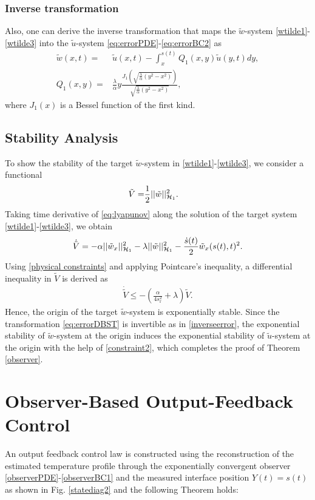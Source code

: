 \documentclass[journal]{IEEEtran}
\begin{document}
\subsubsection{Inverse transformation }
Also, one can derive the inverse transformation that maps the $\tilde{w}$-system  \eqref{wtilde1}-\eqref{wtilde3} into the $\tilde{u}$-system  \eqref{eq:errorPDE}-\eqref{eq:errorBC2} as
\begin{align}\label{inverseerror}
\tilde{w}(x,t) =& \tilde{u}(x,t) - \int_{x}^{s(t)} Q_{1}(x,y) \tilde{u}(y,t) dy, \\
Q_{1}(x,y) =& \frac{\lambda}{\alpha} y\frac{J_1\left(\sqrt{\frac{\lambda}{\alpha} (y^2-x^2)}\right)}{\sqrt{\frac{\lambda}{\alpha} (y^2-x^2)}}, \label{bessel}
\end{align}
where $J_1(x)$ is a Bessel function of the first kind. 

 \subsection{Stability Analysis}
To show the stability of the target $\tilde{w}$-system in \eqref{wtilde1}-\eqref{wtilde3}, we consider a functional
\begin{align}\label{eq:lyapunov}
\tilde{V} = &\frac{1}{2} ||\tilde{w}||_{{\cal H}_1}^2.
\end{align}
Taking time derivative of \eqref{eq:lyapunov} along the solution of the target system \eqref{wtilde1}-\eqref{wtilde3}, we obtain 
\begin{align}
\dot{\tilde{V}} = -\alpha|| \tilde{w}_{x}||_{{\cal H}_{1}}^2  - \lambda  ||\tilde{w}||_{{\cal H}_1}^2  -\frac{\dot{s}(t)}{2}\tilde{w}_{x}(s(t),t)^2.
\end{align}
Using  \eqref{physical constraints} and applying Pointcare's inequality, a differential inequality in  $\tilde{V}$ is derived as
\begin{align}
\dot{\tilde{V}}\leq - \left( \frac{\alpha}{4s_{{\mathrm r}}^2} + \lambda\right) \tilde{V}.
\end{align}
Hence, the origin of the target $\tilde{w}$-system is exponentially stable. Since the transformation \eqref{eq:errorDBST} is invertible as in \eqref{inverseerror}, the exponential stability of $\tilde{w}$-system at the origin induces the exponential stability of $\tilde{u}$-system at the origin with the help of \eqref{constraint2}, which completes the proof of Theorem \ref{observer}. 

\section{Observer-Based Output-Feedback Control }\label{sec:output}
An output feedback control law is  constructed  using the reconstruction of the estimated temperature profile through the exponentially convergent observer  \eqref{observerPDE}-\eqref{observerBC1} and the measured interface position $Y(t)=s(t)$  as shown in  Fig. \ref{statediag2} and the following Theorem holds:
\end{document}
